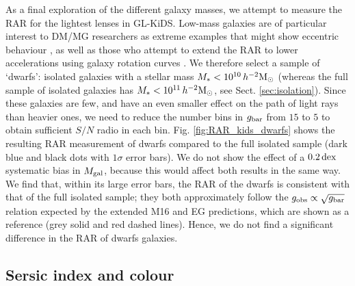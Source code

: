\documentclass[usenatbib]{mnras}
\newcommand{\hmsun}{\,h^{-2} {\rm M_\odot}}
\newcommand{\un}[1]{_{\rm #1}}
\newcommand{\dex}{\, {\rm dex}}
\begin{document}
As a final exploration of the different galaxy masses, we attempt to measure the RAR for the lightest lenses in GL-KiDS. Low-mass galaxies are of particular interest to DM/MG researchers as extreme examples that might show eccentric behaviour \cite{oman2016,dokkum2018,guo2020}, as well as those who attempt to extend the RAR to lower accelerations using galaxy rotation curves \cite{lelli2017b,paolo2019}. We therefore select a sample of `dwarfs': isolated galaxies with a stellar mass $M_*<10^{10} \hmsun$ (whereas the full sample of isolated galaxies has $M_* < 10^{11} \hmsun$, see Sect. \ref{sec:isolation}). Since these galaxies are few, and have an even smaller effect on the path of light rays than heavier ones, we need to reduce the number bins in $g\un{bar}$ from $15$ to $5$ to obtain sufficient $S/N$ radio in each bin. Fig. \ref{fig:RAR_kids_dwarfs} shows the resulting RAR measurement of dwarfs compared to the full isolated sample (dark blue and black dots with $1\sigma$ error bars). We do not show the effect of a $0.2\dex$ systematic bias in $M\un{gal}$, because this would affect both results in the same way. We find that, within its large error bars, the RAR of the dwarfs is consistent with that of the full isolated sample; they both approximately follow the $g\un{obs}\propto\sqrt{g\un{bar}}$ relation expected by the extended M16 and EG predictions, which are shown as a reference (grey solid and red dashed lines). Hence, we do not find a significant difference in the RAR of dwarfs galaxies.

\subsection{Sersic index and colour}
\label{sec:results-types}
\end{document}
